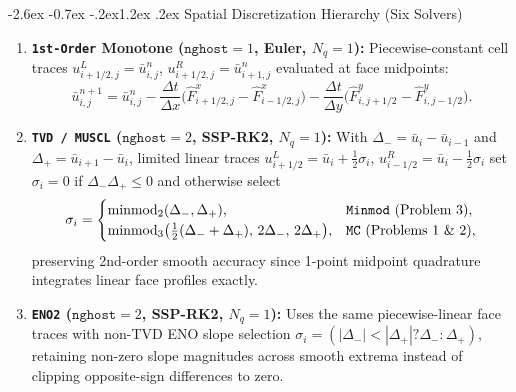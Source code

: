 \documentclass[11pt,a4paper]{article}
\makeatletter
\renewcommand{\section}{\@startsection{section}{1}{\z@}%
  {-2.6ex \@plus -0.7ex \@minus -.2ex}{1.2ex \@plus .2ex}%
  {\normalfont\large\bfseries\color{specnavy}}}
\newcommand{\abs}[1]{\left\lvert #1 \right\rvert}
\newcommand{\code}[1]{\texttt{#1}}
\theoremstyle{definition}
\makeatother
\begin{document}
\section{Spatial Discretization Hierarchy (Six Solvers)}

\begin{enumerate}
\item \textbf{\code{1st-Order} Monotone ($\code{nghost}=1$, Euler, $N_q=1$):} Piecewise-constant cell traces $u_{i+1/2,j}^L = \bar{u}_{i,j}^n$, $u_{i+1/2,j}^R = \bar{u}_{i+1,j}^n$ evaluated at face midpoints:
\begin{equation}
\label{eq:first_box}
\boxed{\;
\bar{u}_{i,j}^{n+1} = \bar{u}_{i,j}^n - \frac{\Delta t}{\Delta x}\bigl(\hat{F}^x_{i+1/2,j} - \hat{F}^x_{i-1/2,j}\bigr)
- \frac{\Delta t}{\Delta y}\bigl(\hat{F}^y_{i,j+1/2} - \hat{F}^y_{i,j-1/2}\bigr).
\;}
\end{equation}

\item \textbf{\code{TVD / MUSCL} ($\code{nghost}=2$, SSP-RK2, $N_q=1$):} With $\Delta_- = \bar{u}_i - \bar{u}_{i-1}$ and $\Delta_+ = \bar{u}_{i+1} - \bar{u}_i$, limited linear traces $u_{i+1/2}^L = \bar{u}_i + \frac{1}{2}\sigma_i$, $u_{i-1/2}^R = \bar{u}_i - \frac{1}{2}\sigma_i$ set $\sigma_i=0$ if $\Delta_-\Delta_+\le 0$ and otherwise select
\[
\sigma_i =
\begin{cases}
\operatorname{minmod}_2(\Delta_-,\Delta_+), & \text{\code{Minmod} (Problem~3)},\\
\operatorname{minmod}_3\bigl(\tfrac{1}{2}(\Delta_-+\Delta_+),\,2\Delta_-,\,2\Delta_+\bigr), & \text{\code{MC} (Problems~1 \& 2)},
\end{cases}
\]
preserving 2nd-order smooth accuracy since 1-point midpoint quadrature integrates linear face profiles exactly.

\item \textbf{\code{ENO2} ($\code{nghost}=2$, SSP-RK2, $N_q=1$):} Uses the same piecewise-linear face traces with non-TVD ENO slope selection $\sigma_i = (\abs{\Delta_-} < \abs{\Delta_+} ? \Delta_- : \Delta_+)$, retaining non-zero slope magnitudes across smooth extrema instead of clipping opposite-sign differences to zero.


\end{enumerate}
\end{document}
